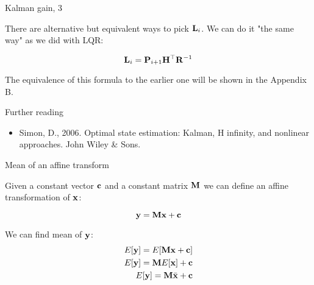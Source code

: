 \documentclass{beamer}
\begin{document}
\begin{frame}{Kalman gain, 3}
	\begin{flushleft}
		
		There are alternative but equivalent ways to pick $\mathbf{L}_i$. We can do it "the same way" as we did with LQR:
		
		\begin{equation}
			\mathbf{L}_i = \mathbf{P}_{i+1} \mathbf{H}^\top \mathbf{R}^{-1}
		\end{equation}
		
		The equivalence of this formula to the earlier one will be shown in the Appendix B.
		
		
	\end{flushleft}
\end{frame}

\begin{frame}{Further reading}
	\begin{flushleft}
		
		\begin{itemize}
			\item Simon, D., 2006. Optimal state estimation: Kalman, H infinity, and nonlinear approaches. John Wiley \& Sons.
		\end{itemize}
		
	\end{flushleft}
\end{frame}


\myqrframe



\begin{frame}
	\begin{flushleft}
		
		
	\end{flushleft}
\end{frame}

\begin{frame}{Mean of an affine transform}
	\begin{flushleft}
		
		Given a constant vector $\mathbf{c}$ and a constant matrix $\mathbf{M}$ we can define an affine transformation of $\mathbf{x}$:
		
		\begin{equation}
			\mathbf{y} = \mathbf{M}\mathbf{x} + \mathbf{c}
		\end{equation}
		
		We can find mean of $\mathbf{y}$:
		\begin{align}
			E[\mathbf{y}] = E[\mathbf{M}\mathbf{x} + \mathbf{c}] \\
			E[\mathbf{y}] = \mathbf{M}E[\mathbf{x}] + \mathbf{c} \\
			E[\mathbf{y}] = \mathbf{M}\bar{\mathbf{x}} + \mathbf{c}
		\end{align}
		
		
	\end{flushleft}
\end{frame}
\end{document}
